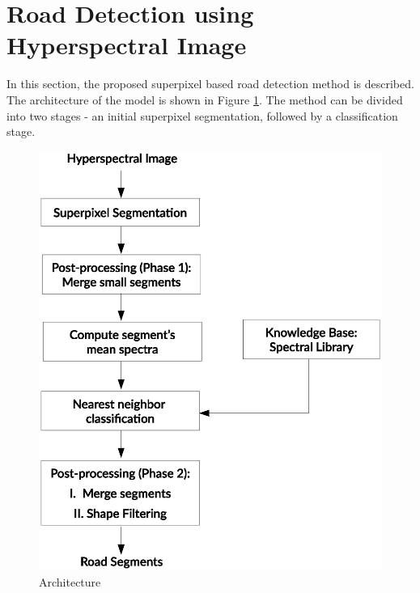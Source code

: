 \documentclass[12pt,twoside]{article}
\theoremstyle{plain}
\theoremstyle{definition}
\theoremstyle{remark}
\begin{document}
\section{Road Detection using Hyperspectral Image}
\label{sec:model}
In this section, the proposed superpixel based road detection method is described. The architecture of the model is shown in Figure \ref{fig:arch}. The method can be divided into two stages - an initial superpixel segmentation, followed by a classification stage. 
\begin{figure}[hbtp]
\centering
\includegraphics[width=\textwidth]{src/model.eps}
\caption{Architecture}
\label{fig:arch}
\end{figure}
\end{document}

